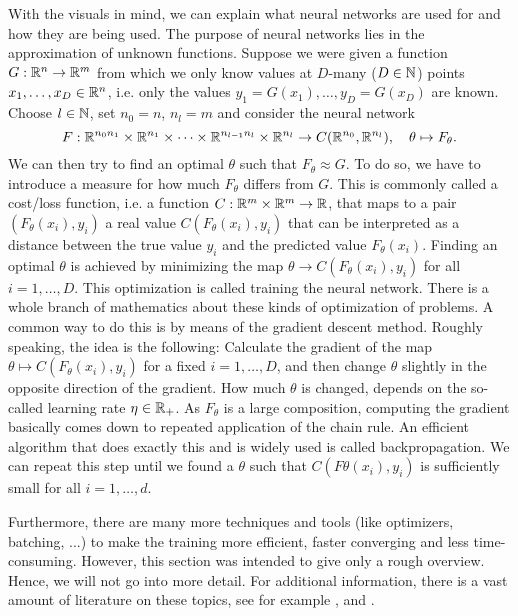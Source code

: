 With the visuals in mind, we can explain what neural networks are used for and how they are being used. 
The purpose of neural networks lies in the  approximation of unknown functions. 
Suppose we were given a function $G:\mathbb{R}^n\to\mathbb{R}^m$ from which we only know values at $D$-many ($D\in\mathbb{N}$) points $x_1,\dots,x_D\in\mathbb{R}^n$, 
i.e. only the values $y_1=G(x_1),\dots,y_D=G(x_D)$ are known.
Choose $l\in\mathbb{N}$, set $n_0=n$, $n_l=m$ and consider the neural network
\begin{equation*}
    F:\mathbb{R}^{n_0n_1}\times\mathbb{R}^{n_1}\times\dots\times\mathbb{R}^{n_{l-1}n_l}\times\mathbb{R}^{n_l}\to C(\mathbb{R}^{n_0},\mathbb{R}^{n_l}), \quad\theta\mapsto F_\theta.
\end{equation*}
We can then try to find an \glqq{}optimal\grqq{} $\theta$ such that $F_\theta\approx G$. 
To do so, we have to introduce a measure for how much $F_\theta$ differs from $G$. 
This is commonly called a cost/loss function, i.e. a function $C:\mathbb{R}^m\times\mathbb{R}^m\to\mathbb{R}$, that maps to a pair $(F_\theta(x_i), y_i)$ a real value
$C(F_\theta(x_i),y_i)$ that can be interpreted as a distance between the true value $y_i$ and the predicted value $F_\theta(x_i)$.
Finding an optimal $\theta$ is achieved by minimizing the map $\theta\to C(F_\theta(x_i),y_i)$ for all $i=1,\dots,D$.
This optimization is called \glqq{}training the neural network\grqq{}. 
There is a whole branch of mathematics about these kinds of optimization of problems. 
A common way to do this is by means of the gradient descent method.
Roughly speaking, the idea is the following: Calculate the gradient of the map $\theta\mapsto C(F_\theta(x_i),y_i)$ for a fixed $i=1,\dots,D$, 
and then change $\theta$ slightly in the opposite direction of the gradient.
How much $\theta$ is changed, depends on the so-called learning rate $\eta\in\mathbb{R}_+$. 
As $F_\theta$ is a large composition, computing the gradient basically comes down to repeated application of the chain rule. 
An efficient algorithm that does exactly this and is widely used is called backpropagation. We can repeat this step until we found a $\theta$ such that 
$C(F\theta(x_i),y_i)$ is sufficiently small for all $i=1,\dots,d$.

Furthermore, there are many more techniques and tools (like optimizers, batching, ...) to make the training more efficient, faster converging and less time-consuming. 
However, this section was intended to give only a rough overview. Hence, we will not go into more detail. 
For additional information, there is a vast amount of literature on these topics, see for example \cite{bookNN1}, \cite{bookNN2} and \cite{paperHyperparameter}.